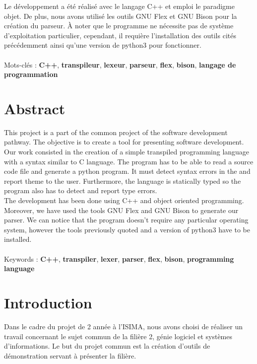 \documentclass[a4paper]{article}%
\begin{document}
Le développement a été réalisé avec le langage C++ et emploi le paradigme objet.
De plus, nous avons utilisé les outils GNU Flex et GNU Bison pour la création du
parseur. À noter que le programme ne nécessite pas de système d'exploitation
particulier, cependant, il requière l'installation des outils cités précédemment
ainsi qu'une version de python3 pour fonctionner. %
\\~\\

\noindent
Mots-clés : \textbf{C++}, \textbf{transpileur}, \textbf{lexeur}, \textbf{parseur},
\textbf{flex}, \textbf{bison},  \textbf{langage de programmation}
\\[2\baselineskip]

\section{Abstract}

This project is a part of the common project of the software development
pathway. The objective is to create a tool for presenting software development.
Our work consisted in the creation of a simple transpiled programming language
with a syntax similar to C language. The program has to be able to read a source
code file and generate a python program. It must detect syntax errors in the and
report theme to the user. Furthermore, the language is statically typed so the
program also has to detect and report type errors.\\

The development has been done using C++ and object oriented programming.
Moreover, we have used the tools GNU Flex and GNU Bison to generate our parser.
We can notice that the program doesn't require any particular operating system,
however the tools previously quoted and a version of python3 have to be
installed.
\\~\\

\noindent
Keywords : \textbf{C++}, \textbf{transpiler}, \textbf{lexer}, \textbf{parser},
\textbf{flex}, \textbf{bison}, \textbf{programming language}

\clearpage{}

\clearpage
\section{Introduction}
\large
Dans le cadre du projet de 2 année à l'ISIMA, nous avons choisi de
réaliser un travail concernant le sujet commun de la filière 2, génie logiciel
et systèmes d'informations. Le but du projet commun est la création d'outils de
démonstration servant à présenter la filière.\\
\end{document}
